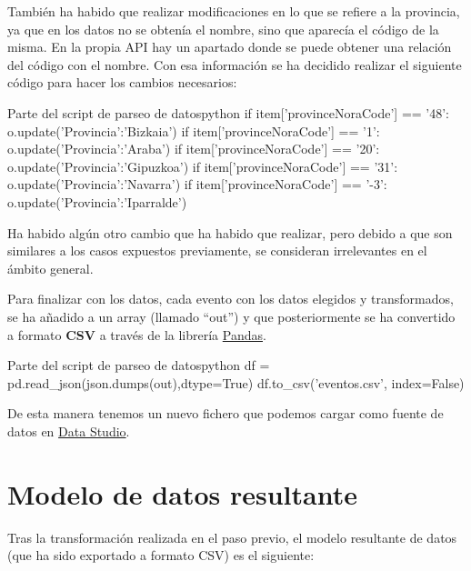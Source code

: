 \documentclass{\ClassPath/viu-tfm-template}
\begin{document}
También ha habido que realizar modificaciones en lo que se refiere a la provincia, ya que en los datos no se obtenía el nombre, sino que aparecía el código de la misma. En la propia API hay un apartado donde se puede obtener una relación del código con el nombre. Con esa información se ha decidido realizar el siguiente código para hacer los cambios necesarios:

\begin{mycode}{Parte del script de parseo de datos}{python}{}
if item['provinceNoraCode'] == '48':
    o.update({'Provincia':'Bizkaia'})
if item['provinceNoraCode'] == '1':
    o.update({'Provincia':'Araba'})
if item['provinceNoraCode'] == '20':
    o.update({'Provincia':'Gipuzkoa'})
if item['provinceNoraCode'] == '31':
    o.update({'Provincia':'Navarra'})
if item['provinceNoraCode'] == '-3':
    o.update({'Provincia':'Iparralde'})
\end{mycode}


Ha habido algún otro cambio que ha habido que realizar, pero debido a que son similares a los casos expuestos previamente, se consideran irrelevantes en el ámbito general.

Para finalizar con los datos, cada evento con los datos elegidos y transformados, se ha añadido a un array (llamado “out”) y que posteriormente se ha convertido a formato \textbf{CSV} a través de la librería \href{https://pandas.pydata.org/}{Pandas}.

\begin{mycode}{Parte del script de parseo de datos}{python}{}
df = pd.read_json(json.dumps(out),dtype=True)
df.to_csv('eventos.csv', index=False)
\end{mycode}

De esta manera tenemos un nuevo fichero  que podemos cargar como fuente de datos en \href{https://datastudio.google.com/}{Data Studio}.

\section{Modelo de datos resultante}

Tras la transformación realizada en el paso previo, el modelo resultante de datos (que ha sido exportado a formato CSV) es el siguiente:
\end{document}
